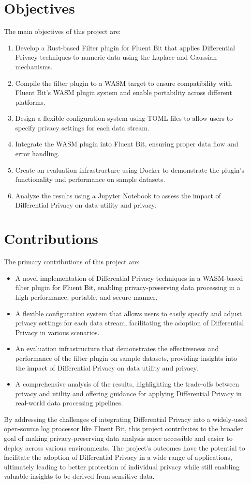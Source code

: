 \section{Objectives}
The main objectives of this project are:
\begin{enumerate}
\item Develop a Rust-based Filter plugin for Fluent Bit that applies Differential Privacy techniques to numeric data using the Laplace and Gaussian mechanisms.
\item Compile the filter plugin to a WASM target to ensure compatibility with Fluent Bit's WASM plugin system and enable portability across different platforms.
\item Design a flexible configuration system using TOML files to allow users to specify privacy settings for each data stream.
\item Integrate the WASM plugin into Fluent Bit, ensuring proper data flow and error handling.
\item Create an evaluation infrastructure using Docker to demonstrate the plugin's functionality and performance on sample datasets.
\item Analyze the results using a Jupyter Notebook to assess the impact of Differential Privacy on data utility and privacy.
\end{enumerate}
\section{Contributions}
The primary contributions of this project are:
\begin{itemize}
\item A novel implementation of Differential Privacy techniques in a WASM-based filter plugin for Fluent Bit, enabling privacy-preserving data processing in a high-performance, portable, and secure manner.
\item A flexible configuration system that allows users to easily specify and adjust privacy settings for each data stream, facilitating the adoption of Differential Privacy in various scenarios.
\item An evaluation infrastructure that demonstrates the effectiveness and performance of the filter plugin on sample datasets, providing insights into the impact of Differential Privacy on data utility and privacy.
\item A comprehensive analysis of the results, highlighting the trade-offs between privacy and utility and offering guidance for applying Differential Privacy in real-world data processing pipelines.
\end{itemize}
By addressing the challenges of integrating Differential Privacy into a widely-used open-source log processor like Fluent Bit, this project contributes to the broader goal of making privacy-preserving data analysis more accessible and easier to deploy across various environments. The project's outcomes have the potential to facilitate the adoption of Differential Privacy in a wide range of applications, ultimately leading to better protection of individual privacy while still enabling valuable insights to be derived from sensitive data.
